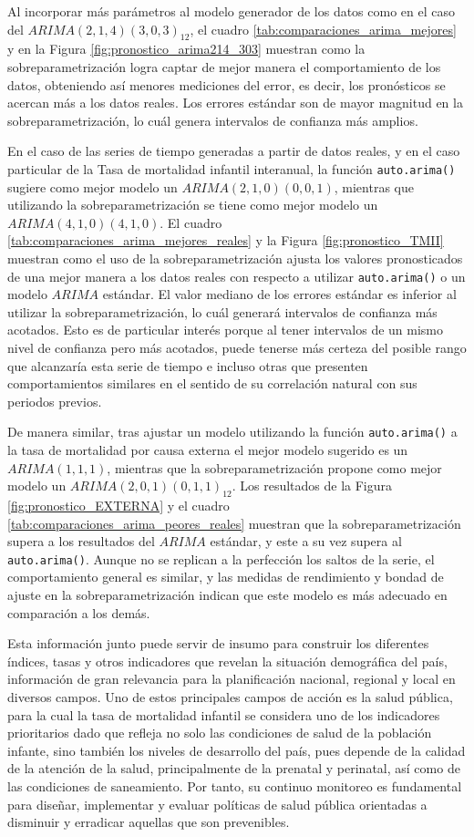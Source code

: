 \documentclass[
]{article}
\begin{document}
Al incorporar más parámetros al modelo generador de los datos como en el
caso del \(ARIMA(2,1,4)(3,0,3)_{12}\), el cuadro
\ref{tab:comparaciones_arima_mejores} y en la Figura
\ref{fig:pronostico_arima214_303} muestran como la sobreparametrización
logra captar de mejor manera el comportamiento de los datos, obteniendo
así menores mediciones del error, es decir, los pronósticos se acercan
más a los datos reales. Los errores estándar son de mayor magnitud en la
sobreparametrización, lo cuál genera intervalos de confianza más
amplios.

En el caso de las series de tiempo generadas a partir de datos reales, y
en el caso particular de la Tasa de mortalidad infantil interanual, la
función \texttt{auto.arima()} sugiere como mejor modelo un
\(ARIMA(2,1,0)(0,0,1)\), mientras que utilizando la sobreparametrización
se tiene como mejor modelo un \(ARIMA(4,1,0)(4,1,0)\). El cuadro
\ref{tab:comparaciones_arima_mejores_reales} y la Figura
\ref{fig:pronostico_TMII} muestran como el uso de la
sobreparametrización ajusta los valores pronosticados de una mejor
manera a los datos reales con respecto a utilizar \texttt{auto.arima()}
o un modelo \(ARIMA\) estándar. El valor mediano de los errores estándar
es inferior al utilizar la sobreparametrización, lo cuál generará
intervalos de confianza más acotados. Esto es de particular interés
porque al tener intervalos de un mismo nivel de confianza pero más
acotados, puede tenerse más certeza del posible rango que alcanzaría
esta serie de tiempo e incluso otras que presenten comportamientos
similares en el sentido de su correlación natural con sus periodos
previos.

De manera similar, tras ajustar un modelo utilizando la función
\texttt{auto.arima()} a la tasa de mortalidad por causa externa el mejor
modelo sugerido es un \(ARIMA(1,1,1)\), mientras que la
sobreparametrización propone como mejor modelo un
\(ARIMA(2,0,1)(0,1,1)_{12}\). Los resultados de la Figura
\ref{fig:pronostico_EXTERNA} y el cuadro
\ref{tab:comparaciones_arima_peores_reales} muestran que la
sobreparametrización supera a los resultados del \(ARIMA\) estándar, y
este a su vez supera al \texttt{auto.arima()}. Aunque no se replican a
la perfección los saltos de la serie, el comportamiento general es
similar, y las medidas de rendimiento y bondad de ajuste en la
sobreparametrización indican que este modelo es más adecuado en
comparación a los demás.

Esta información junto puede servir de insumo para construir los
diferentes índices, tasas y otros indicadores que revelan la situación
demográfica del país, información de gran relevancia para la
planificación nacional, regional y local en diversos campos. Uno de
estos principales campos de acción es la salud pública, para la cual la
tasa de mortalidad infantil se considera uno de los indicadores
prioritarios dado que refleja no solo las condiciones de salud de la
población infante, sino también los niveles de desarrollo del país, pues
depende de la calidad de la atención de la salud, principalmente de la
prenatal y perinatal, así como de las condiciones de saneamiento. Por
tanto, su continuo monitoreo es fundamental para diseñar, implementar y
evaluar políticas de salud pública orientadas a disminuir y erradicar
aquellas que son prevenibles.
\end{document}
